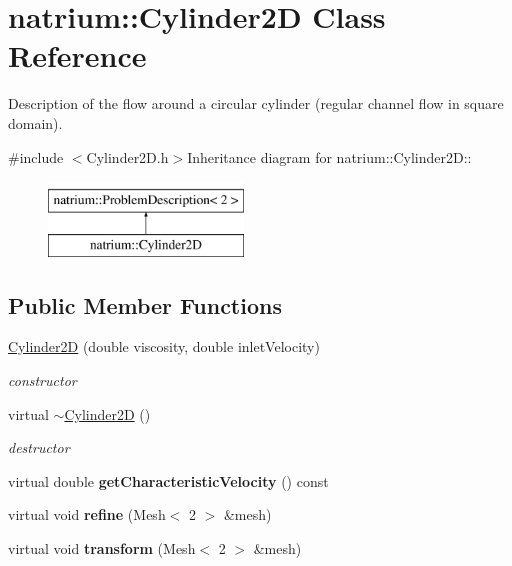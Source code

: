 \hypertarget{classnatrium_1_1Cylinder2D}{
\section{natrium::Cylinder2D Class Reference}
\label{classnatrium_1_1Cylinder2D}
}


Description of the flow around a circular cylinder (regular channel flow in square domain).  


{\ttfamily \#include $<$Cylinder2D.h$>$}Inheritance diagram for natrium::Cylinder2D::\begin{figure}[H]
\begin{center}
\leavevmode
\includegraphics[height=2cm]{classnatrium_1_1Cylinder2D}
\end{center}
\end{figure}
\subsection*{Public Member Functions}
\begin{DoxyCompactItemize}
\item 
\hyperlink{classnatrium_1_1Cylinder2D_a38e5826b6fd4fc859b74783de3999658}{Cylinder2D} (double viscosity, double inletVelocity)
\begin{DoxyCompactList}\small\item\em constructor \item\end{DoxyCompactList}\item 
\hypertarget{classnatrium_1_1Cylinder2D_a40a33168f7deb7f35e4eb7b3f749b4a3}{
virtual \hyperlink{classnatrium_1_1Cylinder2D_a40a33168f7deb7f35e4eb7b3f749b4a3}{$\sim$Cylinder2D} ()}
\label{classnatrium_1_1Cylinder2D_a40a33168f7deb7f35e4eb7b3f749b4a3}

\begin{DoxyCompactList}\small\item\em destructor \item\end{DoxyCompactList}\item 
\hypertarget{classnatrium_1_1Cylinder2D_a6e32e2b875af680163160779aca52134}{
virtual double {\bfseries getCharacteristicVelocity} () const }
\label{classnatrium_1_1Cylinder2D_a6e32e2b875af680163160779aca52134}

\item 
\hypertarget{classnatrium_1_1Cylinder2D_aa67c905852893276844a6f9d6013cc05}{
virtual void {\bfseries refine} (Mesh$<$ 2 $>$ \&mesh)}
\label{classnatrium_1_1Cylinder2D_aa67c905852893276844a6f9d6013cc05}

\item 
\hypertarget{classnatrium_1_1Cylinder2D_a34077d9eecf1277adc4e7255ed695fc0}{
virtual void {\bfseries transform} (Mesh$<$ 2 $>$ \&mesh)}
\label{classnatrium_1_1Cylinder2D_a34077d9eecf1277adc4e7255ed695fc0}

\end{DoxyCompactItemize}


